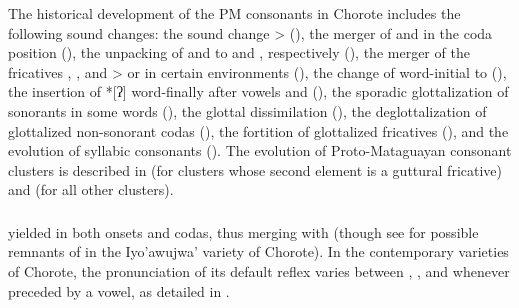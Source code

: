 The historical development of the PM consonants in Chorote includes the following sound changes: the sound change  >  (), the merger of  and  in the coda position (), the unpacking of  and  to  and , respectively (), the merger of the fricatives , , and  >  or  in certain environments (), the change of word-initial  to  (), the insertion of *[ʔ] word-finally after vowels and  (), the sporadic glottalization of sonorants in some words (), the glottal dissimilation (), the deglottalization of glottalized non-sonorant codas (), the fortition of glottalized fricatives (), and the evolution of syllabic consonants (). The evolution of Proto-Mataguayan consonant clusters is described in  (for clusters whose second element is a guttural fricative) and  (for all other clusters).

\subsubsection{}\label{ch-ts}

\sloppy
{} yielded  in both onsets and codas, thus merging with  (though see  for possible remnants of  in the Iyo’awujwa’ variety of Chorote). In the contemporary varieties of Chorote, the pronunciation of its default reflex varies between , , and  whenever preceded by a vowel, as detailed in .

\begin{exe}
    \ex \centipede
    \ex \sisinlaw
    \ex \rootn
    \ex \suncho
    \ex \palm
    \ex \dew
    \ex \grandchildmpl
    \ex \chaguark
    \ex \oldn
    \ex \chaniart
    \ex \offspring
    \ex \bow
    \ex \majan
    \ex \quick
    \ex \jabiru
    \ex \starn
    \ex \gutscw
    \ex \limpkin
    \ex \eyelash
    \ex \basetrunk
    \ex \trunk
    \ex \smoke
    \ex \plits
    \ex \demts
    \ex \tsaqaq
    \ex \chaja
    \ex \spillcw
    \ex \duraznillo
    \ex \silkfloss
    \ex \fullriver
    \ex \tsofa
    \ex \redbrocket
    \ex \healthy
    \ex \knee
    \ex \peccary
    \ex \caracara
    \ex \chaguara
    \ex \wildpepper
\end{exe}

